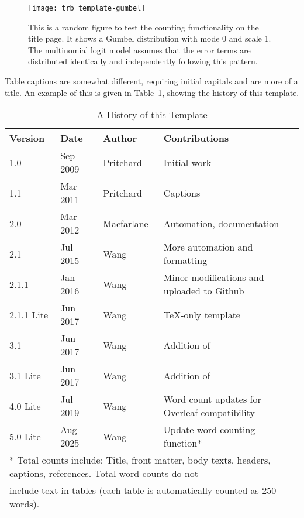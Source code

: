 \documentclass[numbered]{trbunofficial2}
\begin{document}
\begin{figure}[!ht]
  \centering
  \texttt{[image: trb\_template-gumbel]}
  \caption{This is a random figure to test the counting functionality on the title page. It shows a Gumbel distribution with mode 0 and scale 1. The multinomial logit model assumes that the error terms are distributed identically and independently following this pattern.}\label{fig:trial}
\end{figure}

Table captions are somewhat different, requiring initial capitals and are more of a title. An example of this is given in Table~\ref{tab:versions}, showing the history of this template.

\begin{table}[!ht]
	\caption{A History of this Template}\label{tab:versions}
	\begin{center}
		\begin{tabular}{l l l l}
			Version & Date & Author & Contributions \\\hline
			1.0   & Sep 2009 & Pritchard & Initial work \\
			1.1   & Mar 2011 & Pritchard & Captions \\
			2.0   & Mar 2012 & Macfarlane& Automation, documentation\\
			2.1   & Jul 2015 & Wang      & More automation and formatting\\
			2.1.1 & Jan 2016 & Wang      & Minor modifications and uploaded to Github\\
			2.1.1 Lite & Jun 2017 & Wang & \TeX-only template \\
			3.1   & Jun 2017 & Wang      & Addition of \verb1trbunofficial.cls1\\
			3.1 Lite & Jun 2017 & Wang   & Addition of \verb1trbunofficial.cls1\\
			4.0 Lite & Jul 2019 & Wang   & Word count updates for Overleaf compatibility\\
            5.0 Lite & Aug 2025 & Wang   & Update word counting function*\\\hline
                \multicolumn{4}{l}{\footnotesize
                * Total counts include: Title, front matter, body texts, headers, captions, references. Total word counts do not}\\
                \multicolumn{4}{l}{\footnotesize include text in tables (each table is automatically counted as 250 words).} \\
		\end{tabular}
	\end{center}
\end{table}
\end{document}
